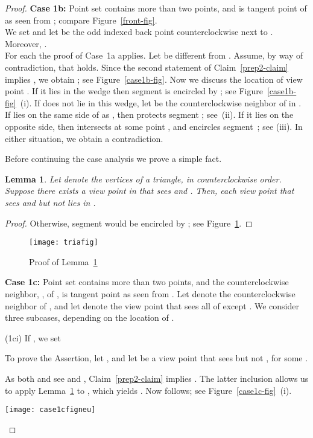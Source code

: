 \documentclass[11pt]{article}
\newtheorem{lemma}{Lemma}
\begin{document}
\begin{proof}
{\bf Case 1b:} Point set  contains more than two points, and  is tangent point of 
as seen from ; compare Figure~\ref{front-fig}.\\
We set  and let  be the odd indexed back point  counterclockwise next to .
Moreover, .\\
For each  the proof of Case~1a applies. Let  be different from .
Assume, by way of contradiction, that  holds. Since the second statement of 
Claim~\ref{prep2-claim} implies
, we obtain ;
see Figure~\ref{case1b-fig}.
Now we discuss the location of view point . If it lies in the wedge  
then segment  is encircled by ; see Figure~\ref{case1b-fig}~(i).
If  does not lie in this wedge, let  be the counterclockwise neighbor of  in .
If  lies on the same side of  as , then 
 protects segment ; see~(ii).
If it lies on the opposite side, then  intersects  
at some point , and  encircles segment~; see (iii).
In either situation, we obtain a contradiction.

Before continuing the case analysis we prove a simple fact.
\begin{lemma}          \label{tria-lem}
Let  denote the vertices of a triangle, in counterclockwise order. Suppose there exists 
a view point  in  that sees  and . Then,
each view point  that sees  and  but not  lies in .
\end{lemma}
\begin{proof}
Otherwise, segment  would be encircled by ; see Figure~\ref{tria-fig}.
\end{proof}
\begin{figure}[hbtp]\begin{center}\texttt{[image: triafig]}\caption{Proof of Lemma~\ref{tria-lem}}\label{tria-fig}
  \end{center}\end{figure}
{\bf Case 1c:} Point set  contains more than two points, and the 
counterclockwise neighbor, , of , is tangent point as seen from .
Let  denote the counterclockwise neighbor of , and let 
denote the view point that sees all of  except .
We consider three subcases, depending on the location of .

(1ci) If , we set 

To prove the Assertion, let , and let  be a view point that 
sees  but not , for some . 

As both  and  see  and , 
Claim~\ref{prep2-claim} implies .
The latter inclusion allows us to apply Lemma~\ref{tria-lem} to ,
which yields . Now  follows; 
see Figure~\ref{case1c-fig}~(i).
\begin{figure*}[hbtp]\begin{center}\texttt{[image: case1cfigneu]}\caption{Illustrations of Case 1c.}\label{case1c-fig}
  \end{center}\end{figure*}



\end{proof}
\end{document}
